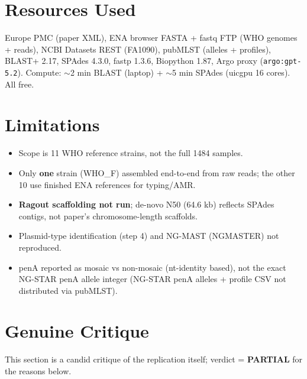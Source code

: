 \documentclass[11pt,letterpaper]{article}
\begin{document}
\section{Resources Used}

Europe PMC (paper XML), ENA browser FASTA + fastq FTP (WHO genomes + reads), NCBI Datasets REST (FA1090), pubMLST (alleles + profiles), BLAST+ 2.17, SPAdes 4.3.0, fastp 1.3.6, Biopython 1.87, Argo proxy (\texttt{argo:gpt-5.2}). Compute: $\sim$2 min BLAST (laptop) + $\sim$5 min SPAdes (uicgpu 16 cores). All free.

\section{Limitations}

\begin{itemize}[leftmargin=1.5em]
  \item Scope is 11 WHO reference strains, not the full 1484 samples.
  \item Only \textbf{one} strain (WHO\_F) assembled end-to-end from raw reads; the other 10 use finished ENA references for typing/AMR.
  \item \textbf{Ragout scaffolding not run}; de-novo N50 (64.6 kb) reflects SPAdes contigs, not paper's chromosome-length scaffolds.
  \item Plasmid-type identification (step 4) and NG-MAST (NGMASTER) not reproduced.
  \item penA reported as mosaic vs non-mosaic (nt-identity based), not the exact NG-STAR penA allele integer (NG-STAR penA alleles + profile CSV not distributed via pubMLST).
\end{itemize}

\section{Genuine Critique}

This section is a candid critique of the replication itself; verdict = \textbf{PARTIAL} for the reasons below.
\end{document}
